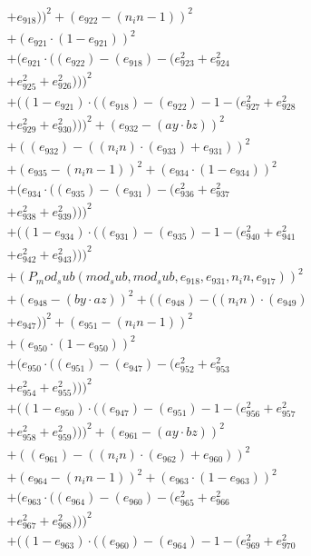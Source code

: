 \documentclass[10pt, a4paper]{article}
\begin{document}
\begin{small}
\begin{align*}
& + e_{918}))^{2} + (e_{922} - (n_in - 1))^{2} \\
& + (e_{921}  \cdot  (1 - e_{921}))^{2} \\
& + (e_{921}  \cdot  ((e_{922}) - (e_{918}) - (e_{923}^{2} + e_{924}^{2} \\
& + e_{925}^{2} + e_{926}^{2})))^{2} \\
& + ((1 - e_{921})  \cdot  ((e_{918}) - (e_{922}) - 1 - (e_{927}^{2} + e_{928}^{2} \\
& + e_{929}^{2} + e_{930}^{2})))^{2} + (e_{932} - (ay  \cdot  bz))^{2} \\
& + ((e_{932}) - ((n_in)  \cdot  (e_{933}) + e_{931}))^{2} \\
& + (e_{935} - (n_in - 1))^{2} + (e_{934}  \cdot  (1 - e_{934}))^{2} \\
& + (e_{934}  \cdot  ((e_{935}) - (e_{931}) - (e_{936}^{2} + e_{937}^{2} \\
& + e_{938}^{2} + e_{939}^{2})))^{2} \\
& + ((1 - e_{934})  \cdot  ((e_{931}) - (e_{935}) - 1 - (e_{940}^{2} + e_{941}^{2} \\
& + e_{942}^{2} + e_{943}^{2})))^{2} \\
& + (P_mod_sub(mod_sub, mod_sub, e_{918}, e_{931}, n_in, e_{917}))^{2} \\
& + (e_{948} - (by  \cdot  az))^{2} + ((e_{948}) - ((n_in)  \cdot  (e_{949}) \\
& + e_{947}))^{2} + (e_{951} - (n_in - 1))^{2} \\
& + (e_{950}  \cdot  (1 - e_{950}))^{2} \\
& + (e_{950}  \cdot  ((e_{951}) - (e_{947}) - (e_{952}^{2} + e_{953}^{2} \\
& + e_{954}^{2} + e_{955}^{2})))^{2} \\
& + ((1 - e_{950})  \cdot  ((e_{947}) - (e_{951}) - 1 - (e_{956}^{2} + e_{957}^{2} \\
& + e_{958}^{2} + e_{959}^{2})))^{2} + (e_{961} - (ay  \cdot  bz))^{2} \\
& + ((e_{961}) - ((n_in)  \cdot  (e_{962}) + e_{960}))^{2} \\
& + (e_{964} - (n_in - 1))^{2} + (e_{963}  \cdot  (1 - e_{963}))^{2} \\
& + (e_{963}  \cdot  ((e_{964}) - (e_{960}) - (e_{965}^{2} + e_{966}^{2} \\
& + e_{967}^{2} + e_{968}^{2})))^{2} \\
& + ((1 - e_{963})  \cdot  ((e_{960}) - (e_{964}) - 1 - (e_{969}^{2} + e_{970}^{2} \\

\end{align*}
\end{small}
\end{document}
